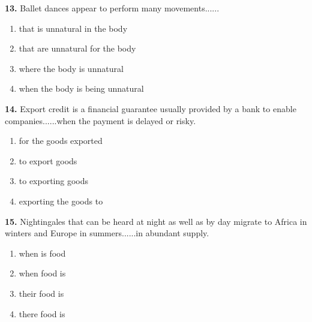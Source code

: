 \documentclass[12pt]{article}
\begin{document}
\par
\vspace{0.25\baselineskip}
\noindent\textbf{13.} Ballet dances appear to perform many movements......
\begin{enumerate}[label=(\Alph*),leftmargin=*,itemsep=0.2em]
\item that is unnatural in the body
\item that are unnatural for the body
\item where the body is unnatural
\item when the body is being unnatural
\end{enumerate}
\par
\vspace{0.25\baselineskip}
\noindent\textbf{14.} Export credit is a financial guarantee usually provided by a bank to enable companies......when the payment is delayed or risky.
\begin{enumerate}[label=(\Alph*),leftmargin=*,itemsep=0.2em]
\item for the goods exported
\item to export goods
\item to exporting goods
\item exporting the goods to
\end{enumerate}
\par
\vspace{0.25\baselineskip}
\noindent\textbf{15.} Nightingales that can be heard at night as well as by day migrate to Africa in winters and Europe in summers......in abundant supply.
\begin{enumerate}[label=(\Alph*),leftmargin=*,itemsep=0.2em]
\item when is food
\item when food is
\item their food is
\item there food is
\end{enumerate}
\par
\vspace{0.25\baselineskip}
\end{document}
